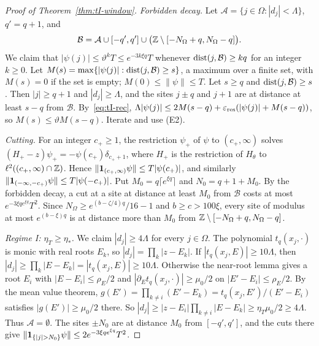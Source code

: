 \begin{proof}[Proof of Theorem~\ref{thm:tI-window}]
\emph{Forbidden decay.} Let $\mathcal A=\{j\in\Omega:|d_j|<\Lambda\}$, $q'=q+1$, and
\[
\mathcal B=\mathcal A\cup[-q',q']\cup\bigl(\mathbb Z\setminus[-N_\Omega+q,N_\Omega-q]\bigr).
\]
We claim that $|\psi(j)|\le\vartheta^kT\le e^{-3k\xi q}T$ whenever $\operatorname{dist}(j,\mathcal B)\ge kq$ for an integer $k\ge0$. Let $M(s)=\max\{|\psi(j)|:\operatorname{dist}(j,\mathcal B)\ge s\}$, a maximum over a finite set, with $M(s)=0$ if the set is empty; $M(0)\le\|\psi\|\le T$. Let $s\ge q$ and $\operatorname{dist}(j,\mathcal B)\ge s$. Then $|j|\ge q+1$ and $|d_j|\ge\Lambda$, and the sites $j\pm q$ and $j+1$ are at distance at least $s-q$ from $\mathcal B$. By~\eqref{eq:tI-rec}, $\Lambda|\psi(j)|\le2M(s-q)+\varepsilon_{\mathrm{res}}(|\psi(j)|+M(s-q))$, so $M(s)\le\vartheta M(s-q)$. Iterate and use (E2).

\emph{Cutting.} For an integer $c_+\ge1$, the restriction $\psi_+$ of $\psi$ to $(c_+,\infty)$ solves $(H_+-z)\psi_+=-\psi(c_+)\delta_{c_++1}$, where $H_+$ is the restriction of $H_\theta$ to $\ell^2((c_+,\infty)\cap\mathbb Z)$. Hence $\|\mathbf 1_{(c_+,\infty)}\psi\|\le T|\psi(c_+)|$, and similarly $\|\mathbf 1_{(-\infty,-c_+)}\psi\|\le T|\psi(-c_+)|$. Put $M_0=q\lceil e^{\xi q}\rceil$ and $N_0=q+1+M_0$. By the forbidden decay, a cut at a site at distance at least $M_0$ from $\mathcal B$ costs at most $e^{-3\xi qe^{\xi q}}T^2$. Since $N_\Omega\ge e^{(b-\zeta/4)q}/16-1$ and $b\ge c>100\xi$, every site of modulus at most $e^{(b-\xi)q}$ is at distance more than $M_0$ from $\mathbb Z\setminus[-N_\Omega+q,N_\Omega-q]$.

\emph{Regime I: $\eta_T\ge\eta_*$.} We claim $|d_j|\ge4\Lambda$ for every $j\in\Omega$. The polynomial $t_q(x_j,\cdot)$ is monic with real roots $E_k$, so $|d_j|=\prod_k|z-E_k|$. If $|t_q(x_j,E)|\ge10\Lambda$, then $|d_j|\ge\prod_k|E-E_k|=|t_q(x_j,E)|\ge10\Lambda$. Otherwise the near-root lemma gives a root $E_i$ with $|E-E_i|\le\rho_E/2$ and $|\partial_Et_q(x_j,\cdot)|\ge\mu_0/2$ on $|E'-E_i|\le\rho_E/2$. By the mean value theorem, $g(E')=\prod_{k\ne i}(E'-E_k)=t_q(x_j,E')/(E'-E_i)$ satisfies $|g(E')|\ge\mu_0/2$ there. So $|d_j|\ge|z-E_i|\prod_{k\ne i}|E-E_k|\ge\eta_T\mu_0/2\ge4\Lambda$. Thus $\mathcal A=\emptyset$. The sites $\pm N_0$ are at distance $M_0$ from $[-q',q']$, and the cuts there give $\|\un_{\{|j|>N_0\}}\psi\|\le2e^{-3\xi qe^{\xi q}}T^2$.


\end{proof}
